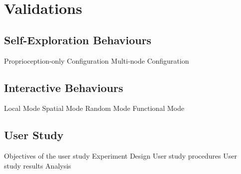 \chapter{Validations} \label{chap:validations}

\section{Self-Exploration Behaviours}
Proprioception-only Configuration
Multi-node Configuration

\section{Interactive Behaviours}

Local Mode
Spatial Mode
Random Mode
Functional Mode

\section{User Study}
Objectives of the user study
Experiment Design
User study procedures
User study results
Analysis
